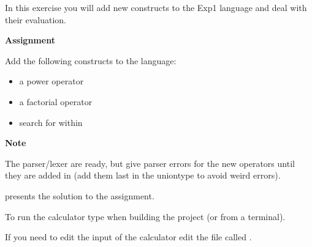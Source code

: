 In this exercise you will add new constructs to the Exp1 language and deal with
their evaluation.

{\bf Assignment}

Add the following constructs to the language:
\begin{itemize}
\item a power operator
\item a factorial operator
\item search for  within 
\end{itemize}

{\bf Note}

The parser/lexer are ready, but give parser errors for the new operators
until they are added in  (add them last in the uniontype to avoid weird
errors).

 presents the solution to the assignment.

To run the calculator type  when building the project (or  from a terminal).

If you need to edit the input of the calculator edit the file called .
